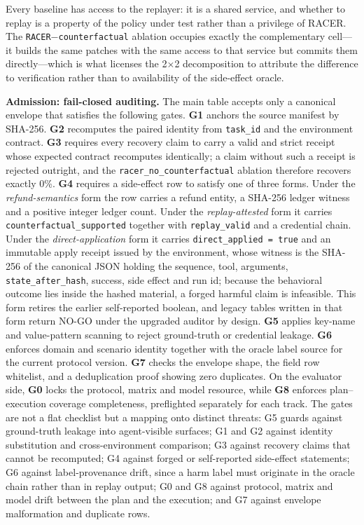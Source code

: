 \documentclass[review]{fcs}
\begin{document}
Every baseline has access to the replayer: it is a shared service, and whether to replay is a property of the policy under test rather than a privilege of RACER. The \texttt{RACER$-$counterfactual} ablation occupies exactly the complementary cell---it builds the same patches with the same access to that service but commits them directly---which is what licenses the 2$\times$2 decomposition to attribute the difference to verification rather than to availability of the side-effect oracle.

\textbf{Admission: fail-closed auditing.} The main table accepts only a canonical envelope that satisfies the following gates. \textbf{G1} anchors the source manifest by SHA-256. \textbf{G2} recomputes the paired identity from \texttt{task\_id} and the environment contract. \textbf{G3} requires every recovery claim to carry a valid and strict receipt whose expected contract recomputes identically; a claim without such a receipt is rejected outright, and the \texttt{racer\_no\_counterfactual} ablation therefore recovers exactly 0\%. \textbf{G4} requires a side-effect row to satisfy one of three forms. Under the \emph{refund-semantics} form the row carries a refund entity, a SHA-256 ledger witness and a positive integer ledger count. Under the \emph{replay-attested} form it carries \texttt{counterfactual\_supported} together with \texttt{replay\_valid} and a credential chain. Under the \emph{direct-application} form it carries \texttt{direct\_applied = true} and an immutable apply receipt issued by the environment, whose witness is the SHA-256 of the canonical JSON holding the sequence, tool, arguments, \texttt{state\_after\_hash}, success, side effect and run id; because the behavioral outcome lies inside the hashed material, a forged harmful claim is infeasible. This form retires the earlier self-reported boolean, and legacy tables written in that form return NO-GO under the upgraded auditor by design. \textbf{G5} applies key-name and value-pattern scanning to reject ground-truth or credential leakage. \textbf{G6} enforces domain and scenario identity together with the oracle label source for the current protocol version. \textbf{G7} checks the envelope shape, the field row whitelist, and a deduplication proof showing zero duplicates. On the evaluator side, \textbf{G0} locks the protocol, matrix and model resource, while \textbf{G8} enforces plan--execution coverage completeness, preflighted separately for each track. The gates are not a flat checklist but a mapping onto distinct threats: G5 guards against ground-truth leakage into agent-visible surfaces; G1 and G2 against identity substitution and cross-environment comparison; G3 against recovery claims that cannot be recomputed; G4 against forged or self-reported side-effect statements; G6 against label-provenance drift, since a harm label must originate in the oracle chain rather than in replay output; G0 and G8 against protocol, matrix and model drift between the plan and the execution; and G7 against envelope malformation and duplicate rows.
\end{document}
